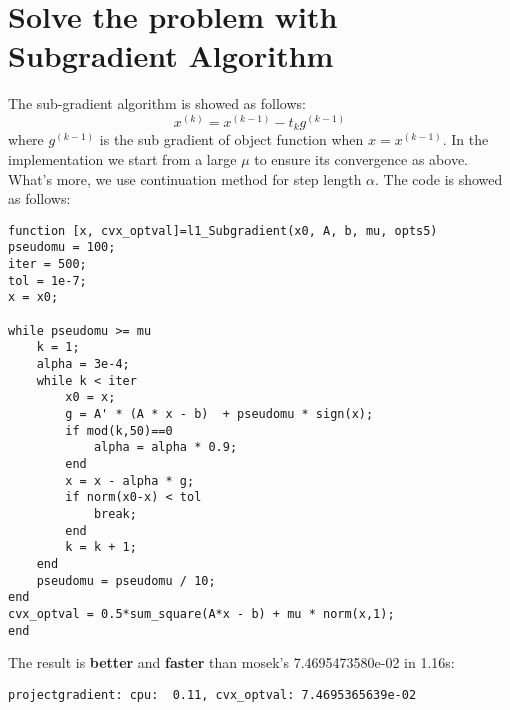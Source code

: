 \documentclass[11pt, oneside]{article}   	%
\begin{document}
\section{Solve the problem with Subgradient Algorithm}
The sub-gradient algorithm is showed as follows:
\begin{equation}
x ^ { ( k ) } = x ^ { ( k - 1 ) } - t _ { k } g ^ { ( k - 1 ) }
\end{equation}
where $g^{(k-1)}$ is the sub gradient of object function when $x = x^{(k-1)}$.
In the implementation we start from a large $\mu$ to ensure its convergence as above. What's more, we use continuation method for step length $\alpha$. The code is showed as follows:
\lstset{
 frame=single, 
breaklines=true,
language=MATLAB,
 }
\begin{lstlisting}
function [x, cvx_optval]=l1_Subgradient(x0, A, b, mu, opts5)
pseudomu = 100; 
iter = 500; 
tol = 1e-7;
x = x0;

while pseudomu >= mu
    k = 1;
    alpha = 3e-4;
    while k < iter
        x0 = x;
        g = A' * (A * x - b)  + pseudomu * sign(x);
        if mod(k,50)==0
            alpha = alpha * 0.9;
        end
        x = x - alpha * g;
        if norm(x0-x) < tol
            break;
        end
        k = k + 1;
    end
    pseudomu = pseudomu / 10;
end
cvx_optval = 0.5*sum_square(A*x - b) + mu * norm(x,1);
end
\end{lstlisting}

The result is \textbf{better} and \textbf{faster} than mosek's 7.4695473580e-02 in 1.16s:
\lstset{
 frame=single, 
breaklines=true,
language=MATLAB,
 }
\begin{lstlisting}
projectgradient: cpu:  0.11, cvx_optval: 7.4695365639e-02
\end{lstlisting}
\end{document}
